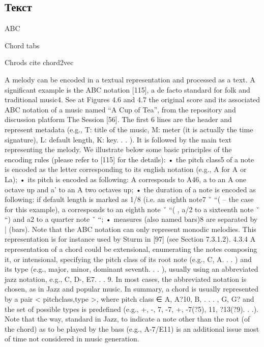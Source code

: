 \subsection{Текст}

ABC \cite{Sturm2015}

Chord tabs

Chrods cite chord2vec

A melody can be encoded in a textual representation and processed as a text. A significant example is the ABC notation [115], a de facto standard for folk and traditional music4. See at Figures 4.6 and 4.7 the original score and its associated ABC notation of a music named “A Cup of Tea”, from the repository and discussion platform The Session [56]. The first 6 lines are the header and represent metadata (e.g., T: title of the music, M:
meter (it is actually the time signature), L: default length, K: key. . . ). It is followed by the main text representing the melody. We illustrate below some basic principles of the encoding rules (please refer to [115] for the details):
• the pitch class5 of a note is encoded as the letter corresponding to its english notation (e.g., A for A or La);
• its pitch is encoded as following: A corresponds to A46, a to an A one octave up and a’ to an A two octaves up;
• the duration of a note is encoded as following: if default length is marked as 1/8 (i.e. an eighth note7
ˇ “( – the case for this example), a corresponds to an eighth note ˇ “( , a/2 to a sixteenth note ˇ “) and a2 to a quarter note ˇ “;
• measures (also named bars)8 are separated by | (bars). Note that the ABC notation can only represent monodic melodies. This representation
is for instance used by Sturm in [97] (see Section 7.3.1.2). 4.3.4
A representation of a chord could be extensional, enumerating the notes composing it, or intensional, specifying the pitch class of its root note (e.g., C, A. . . ) and its type (e.g., major, minor, dominant seventh. . . ), usually using an abbreviated jazz notation, e.g., C, D-, E7. . . 9. In most cases, the abbreviated notation is chosen, as in Jazz and popular music. In summary, a chord is usually represented by a pair < pitchclass,type >, where pitch
class ∈ {A, A?10, B, . . . , G, G?} and the set of possible types is predefined (e.g., {+, -, 7, -7, +, -7(?5), 11, ?13(?9). . .}). Note that the way, standard in Jazz, to indicate a note other than the root (of the chord) as to be played by the bass (e.g., A-7/E11) is an additional issue most of time not considered in music generation.

